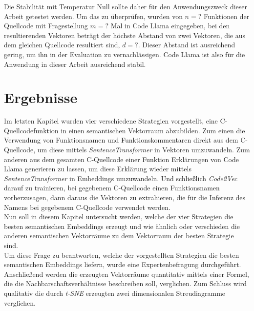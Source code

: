 \documentclass[12pt,letterpaper,ngerman]{article}
\begin{document}
Die Stabilität mit Temperatur Null sollte daher für den
Anwendungszweck dieser Arbeit getestet werden. Um das zu
überprüfen, wurden von $n = ?$ Funktionen der Quellcode mit 
Fragestellung $m = ?$ Mal in Code Llama eingegeben, bei den 
resultierenden Vektoren beträgt der höchste Abstand von zwei 
Vektoren, die aus dem gleichen Quellcode resultiert sind, $d = ?$.
Dieser Abstand ist ausreichend gering, um ihn in der Evaluation 
zu vernachlässigen. Code Llama ist also für die Anwendung 
in dieser Arbeit ausreichend stabil.
\pagebreak
\section{Ergebnisse}
Im letzten Kapitel wurden vier verschiedene Strategien vorgestellt,
eine C-Quellcodefunktion in einen semantischen Vektorraum abzubilden.
Zum einen die Verwendung von Funktionsnamen und Funktionskommentaren 
direkt aus dem C-Quellcode, um diese mittels \textit{SentenceTransformer}
in Vektoren umzuwandeln. Zum anderen aus dem gesamten C-Quellcode einer
Funktion Erklärungen von Code Llama generieren zu lassen, um diese 
Erklärung wieder mittels \textit{SentenceTransformer} in Embeddings
umzuwandeln. Und schließlich \textit{Code2Vec} darauf zu trainieren,
bei gegebenem C-Quellcode einen Funktionsnamen vorherzusagen, dann 
daraus die Vektoren zu extrahieren, die für die Inferenz des Namens
bei gegebenem C-Quellcode verwendet werden.\\
Nun soll in diesem Kapitel untersucht werden, welche der vier Strategien
die besten semantischen Embeddings erzeugt und wie ähnlich oder verschieden
die anderen semantischen Vektorräume zu dem Vektorraum der besten Strategie
sind.\\
Um diese Frage zu beantworten, welche der vorgestellten Strategien
die besten semantischen Embeddings liefern, wurde eine Expertenbefragung 
durchgeführt. Anschließend werden die erzeugten Vektorräume quantitativ
mittels einer Formel, die die Nachbarschaftsverhältnisse beschreiben soll,
verglichen. Zum Schluss wird qualitativ die durch \textit{t-SNE} erzeugten
zwei dimensionalen Streudiagramme verglichen.
\end{document}
